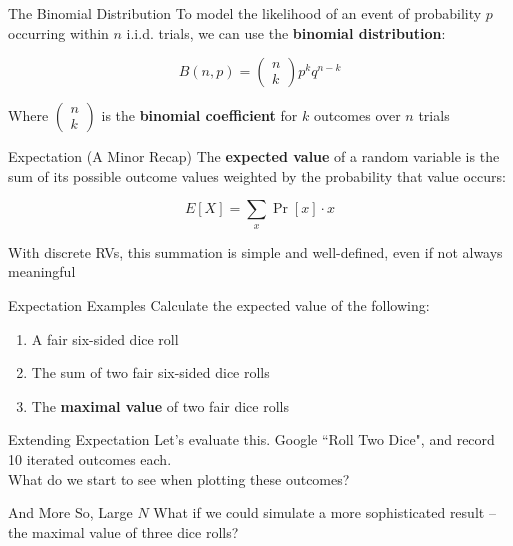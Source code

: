 \documentclass[10pt]{beamer}
\begin{document}
\begin{frame}{The Binomial Distribution}
To model the likelihood of an event of probability $p$ occurring within $n$ i.i.d. trials, we can use the \textbf{binomial distribution}:

    \[B(n,p) = \begin{pmatrix}
        n \\ k
    \end{pmatrix} p^k q^{n-k}\]

    Where $\begin{pmatrix}
        n \\k
    \end{pmatrix}$ is the \textbf{binomial coefficient} for $k$ outcomes over $n$ trials
\end{frame}

\begin{frame}{Expectation (A Minor Recap)}
    The \textbf{expected value} of a random variable is the sum of its possible outcome values weighted by the probability that value occurs:

    \[E[X] = \sum_x \Pr[x] \cdot x\]

    With discrete RVs, this summation is simple and well-defined, even if not always meaningful
\end{frame}

\begin{frame}{Expectation Examples}
    Calculate the expected value of the following:
    \begin{enumerate}
        \item A fair six-sided dice roll
        \item The sum of two fair six-sided dice rolls
        \item The \textbf{maximal value} of two fair dice rolls
    \end{enumerate}
\end{frame}

\begin{frame}{Extending Expectation}
    Let's evaluate this. Google ``Roll Two Dice", and record 10 iterated outcomes each.\\ \pause
\vspace{1cm}
What do we start to see when plotting these outcomes?
    
\end{frame}

\begin{frame}{And More So, Large $N$}
    What if we could simulate a more sophisticated result -- the maximal value of three dice rolls?
\end{frame}
\end{document}
